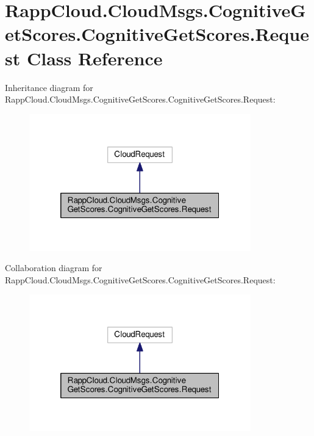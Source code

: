 \hypertarget{classRappCloud_1_1CloudMsgs_1_1CognitiveGetScores_1_1CognitiveGetScores_1_1Request}{\section{Rapp\-Cloud.\-Cloud\-Msgs.\-Cognitive\-Get\-Scores.\-Cognitive\-Get\-Scores.\-Request Class Reference}
\label{classRappCloud_1_1CloudMsgs_1_1CognitiveGetScores_1_1CognitiveGetScores_1_1Request}
}


Inheritance diagram for Rapp\-Cloud.\-Cloud\-Msgs.\-Cognitive\-Get\-Scores.\-Cognitive\-Get\-Scores.\-Request\-:
\nopagebreak
\begin{figure}[H]
\begin{center}
\leavevmode
\includegraphics[width=272pt]{classRappCloud_1_1CloudMsgs_1_1CognitiveGetScores_1_1CognitiveGetScores_1_1Request__inherit__graph}
\end{center}
\end{figure}


Collaboration diagram for Rapp\-Cloud.\-Cloud\-Msgs.\-Cognitive\-Get\-Scores.\-Cognitive\-Get\-Scores.\-Request\-:
\nopagebreak
\begin{figure}[H]
\begin{center}
\leavevmode
\includegraphics[width=272pt]{classRappCloud_1_1CloudMsgs_1_1CognitiveGetScores_1_1CognitiveGetScores_1_1Request__coll__graph}
\end{center}
\end{figure}
